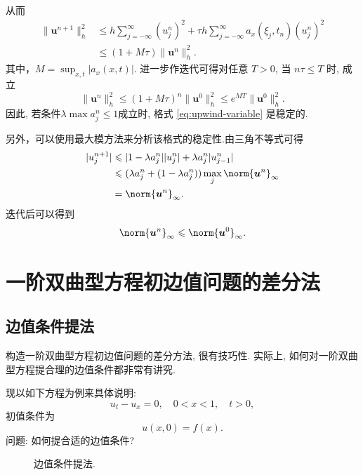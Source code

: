 从而
\begin{align*}
    \|\bm{u}^{n+1}\|_h^2 &\leq h\sum_{j=-\infty}^\infty (u_j^n)^2 + \tau h\sum_{j=-\infty}^\infty a_x(\xi_j, t_n)(u_j^n)^2 \\
    &\leq (1 + M\tau) \|\bm{u}^n\|_h^2.
\end{align*}
其中，$M=\sup_{x,t} |a_x(x,t)|$.
进一步作迭代可得对任意 $T > 0$, 当 $n\tau \leq T$ 时, 成立
\begin{equation*}
    \|\bm{u}^n\|_h^2 \leq (1 + M\tau)^n \|\bm{u}^0\|_h^2 \leq e^{MT} \|\bm{u}^0\|_h^2.
\end{equation*}
因此, 若条件$\lambda \max a_j^n\leq 1$成立时, 格式 \eqref{eq:upwind-variable} 是稳定的.

另外，可以使用最大模方法来分析该格式的稳定性.由三角不等式可得
\begin{align*}
    |u_j^{n+1}| &\leq |1-\lambda a_j^n||u_j^n| + \lambda a_j^n |u_{j-1}^n| \\
    &\leq (\lambda a_j^n+(1-\lambda a_j^n))\max_{j}\norm{\bm{u}^n}_\infty \\
    &= \norm{\bm{u}^n}_\infty.
\end{align*}
迭代后可以得到
\begin{equation*}
    \norm{\bm{u}^n}_\infty \leq \norm{\bm{u}^0}_\infty.
\end{equation*}

\section{一阶双曲型方程初边值问题的差分法}

\subsection{边值条件提法}

构造一阶双曲型方程初边值问题的差分方法, 很有技巧性. 实际上, 如何对一阶双曲型方程提合理的边值条件都非常有讲究.

现以如下方程为例来具体说明:
\begin{equation*}
    u_t - u_x = 0, \quad 0 < x < 1, \quad t > 0,
\end{equation*}
初值条件为
\begin{equation*}
    u(x,0) = f(x).
\end{equation*}
问题: 如何提合适的边值条件?

\begin{figure}[htbp]
    \centering
    \caption{边值条件提法.}
\end{figure}

